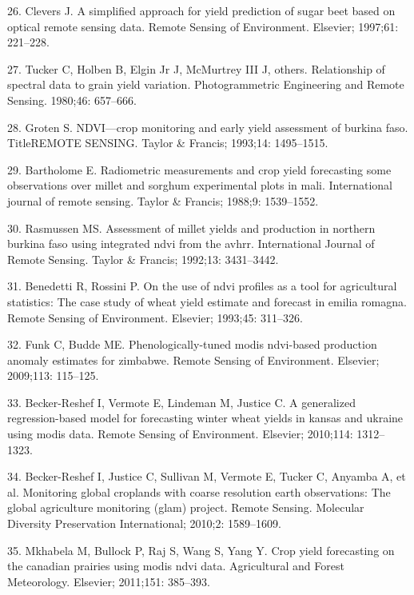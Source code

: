 \documentclass[]{elsarticle} %
\begin{document}
\hypertarget{ref-clevers1997simplified}{}
26. Clevers J. A simplified approach for yield prediction of sugar beet
based on optical remote sensing data. Remote Sensing of Environment.
Elsevier; 1997;61: 221--228.

\hypertarget{ref-tucker1980relationship}{}
27. Tucker C, Holben B, Elgin Jr J, McMurtrey III J, others.
Relationship of spectral data to grain yield variation. Photogrammetric
Engineering and Remote Sensing. 1980;46: 657--666.

\hypertarget{ref-groten1993ndvi}{}
28. Groten S. NDVI---crop monitoring and early yield assessment of
burkina faso. TitleREMOTE SENSING. Taylor \& Francis; 1993;14:
1495--1515.

\hypertarget{ref-bartholome1988radiometric}{}
29. Bartholome E. Radiometric measurements and crop yield forecasting
some observations over millet and sorghum experimental plots in mali.
International journal of remote sensing. Taylor \& Francis; 1988;9:
1539--1552.

\hypertarget{ref-rasmussen1992assessment}{}
30. Rasmussen MS. Assessment of millet yields and production in northern
burkina faso using integrated ndvi from the avhrr. International Journal
of Remote Sensing. Taylor \& Francis; 1992;13: 3431--3442.

\hypertarget{ref-benedetti1993use}{}
31. Benedetti R, Rossini P. On the use of ndvi profiles as a tool for
agricultural statistics: The case study of wheat yield estimate and
forecast in emilia romagna. Remote Sensing of Environment. Elsevier;
1993;45: 311--326.

\hypertarget{ref-funk2009phenologically}{}
32. Funk C, Budde ME. Phenologically-tuned modis ndvi-based production
anomaly estimates for zimbabwe. Remote Sensing of Environment. Elsevier;
2009;113: 115--125.

\hypertarget{ref-becker2010generalized}{}
33. Becker-Reshef I, Vermote E, Lindeman M, Justice C. A generalized
regression-based model for forecasting winter wheat yields in kansas and
ukraine using modis data. Remote Sensing of Environment. Elsevier;
2010;114: 1312--1323.

\hypertarget{ref-becker2010monitoring}{}
34. Becker-Reshef I, Justice C, Sullivan M, Vermote E, Tucker C, Anyamba
A, et al. Monitoring global croplands with coarse resolution earth
observations: The global agriculture monitoring (glam) project. Remote
Sensing. Molecular Diversity Preservation International; 2010;2:
1589--1609.

\hypertarget{ref-mkhabela2011crop}{}
35. Mkhabela M, Bullock P, Raj S, Wang S, Yang Y. Crop yield forecasting
on the canadian prairies using modis ndvi data. Agricultural and Forest
Meteorology. Elsevier; 2011;151: 385--393.
\end{document}
